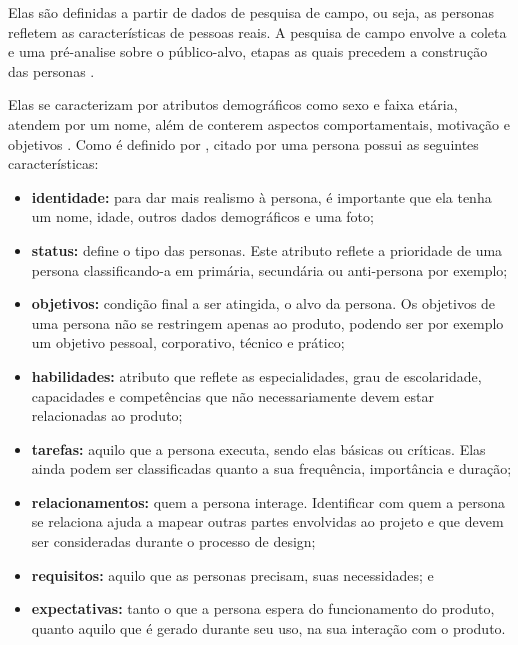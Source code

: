Elas são definidas a partir de dados de pesquisa de campo, ou seja, as personas refletem as características de pessoas reais. A pesquisa de campo envolve a coleta e uma pré-analise sobre o público-alvo, etapas as quais precedem a construção das personas \cite{usability2020}. 

Elas se caracterizam por atributos demográficos como sexo e faixa etária, atendem por um nome, além de conterem aspectos comportamentais, motivação e objetivos \cite[p. 81]{Vianna_2014}. Como é definido por , citado por \cite[p. 153-154]{BarbosaEtAl2021} uma persona possui as seguintes características: 

\begin{itemize}
    \item \textbf{identidade:} para dar mais realismo à persona, é importante que ela tenha um nome, idade, outros dados demográficos e uma foto;

    \item \textbf{status:} define o tipo das personas. Este atributo reflete a prioridade de uma persona classificando-a em primária, secundária ou anti-persona por exemplo;

    \item \textbf{objetivos:} condição final a ser atingida, o alvo da persona. Os objetivos de uma persona não se restringem apenas ao produto, podendo ser por exemplo um objetivo pessoal, corporativo, técnico e prático;

    \item \textbf{habilidades:} atributo que reflete as especialidades, grau de escolaridade, capacidades e competências que não necessariamente devem estar relacionadas ao produto; 

    \item \textbf{tarefas:} aquilo que a persona executa, sendo elas básicas ou críticas. Elas ainda podem ser classificadas quanto a sua frequência, importância e duração;
    
    \item \textbf{relacionamentos:} quem a persona interage. Identificar com quem a persona se relaciona ajuda a mapear outras partes envolvidas ao projeto e que devem ser consideradas durante o processo de design;
    
    \item \textbf{requisitos:} aquilo que as personas precisam, suas necessidades; e
    
    \item \textbf{expectativas:} tanto o que a persona espera do funcionamento do produto, quanto aquilo que é gerado durante seu uso, na sua interação com o produto.
\end{itemize}

